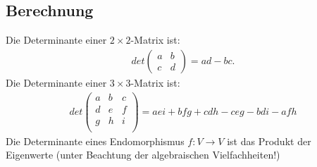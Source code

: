 \documentclass{report}
\begin{document}
\subsection{Berechnung}
Die Determinante einer $2 \times 2$-Matrix ist:
\begin{align*}
 det \begin{pmatrix}
      a & b\\
      c & d
     \end{pmatrix}
    = ad - bc.
\end{align*}
Die Determinante einer $3 \times 3$-Matrix ist:
\begin{align*}
det \begin{pmatrix}
     a & b & c\\
     d & e & f\\
     g & h & i\\
    \end{pmatrix}
    = aei + bfg + cdh - ceg - bdi - afh
\end{align*}
%
Die Determinante eines Endomorphismus $f : V \to V$ ist das Produkt der Eigenwerte (unter Beachtung der algebraischen Vielfachheiten!)
%
\end{document}
